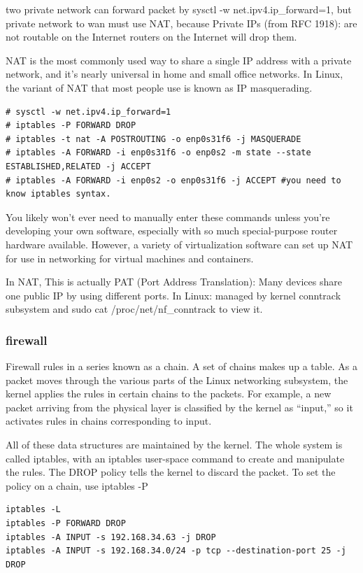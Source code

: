 \documentclass[paper=8.5in:11in, twoside, 12pt, pagesize=pdftex]{book}
\begin{document}
	\par two private network can forward packet by sysctl -w net.ipv4.ip\_forward=1, but private network to wan must use NAT, because Private IPs (from RFC 1918): are not routable on the Internet routers on the Internet will drop them.

	\par NAT is the most commonly used way to share a single IP address with a private network, and it’s nearly universal in home and small office networks. In Linux, the variant of NAT that most people use is known as IP masquerading.

\begin{lstlisting}
# sysctl -w net.ipv4.ip_forward=1
# iptables -P FORWARD DROP
# iptables -t nat -A POSTROUTING -o enp0s31f6 -j MASQUERADE
# iptables -A FORWARD -i enp0s31f6 -o enp0s2 -m state --state
ESTABLISHED,RELATED -j ACCEPT
# iptables -A FORWARD -i enp0s2 -o enp0s31f6 -j ACCEPT #you need to know iptables syntax.
\end{lstlisting}

\par You likely won’t ever need to manually enter these commands unless you’re developing your own software, especially with so much special-purpose router hardware available. However, a variety of virtualization software can set up NAT for use in networking for virtual machines and containers.

	\par In NAT, This is actually PAT (Port Address Translation): Many devices share one public IP by using different ports. In Linux: managed by kernel conntrack subsystem and sudo cat /proc/net/nf\_conntrack to view it. 


\subsubsection{firewall}
\par Firewall rules in a series known as a chain. A set of chains makes up a table. As a packet moves through the various parts of the Linux networking subsystem, the kernel applies the rules in certain chains to the packets. For example, a new packet arriving from the physical layer is classified by the kernel as “input,” so it activates rules in chains corresponding to input.


\par All of these data structures are maintained by the kernel. The whole system is called iptables, with an iptables user-space command to create and manipulate the rules. The DROP policy tells the kernel to discard the packet. To set the policy on a chain, use iptables -P
\begin{lstlisting}
iptables -L
iptables -P FORWARD DROP
iptables -A INPUT -s 192.168.34.63 -j DROP
iptables -A INPUT -s 192.168.34.0/24 -p tcp --destination-port 25 -j DROP
\end{lstlisting}
\end{document}
